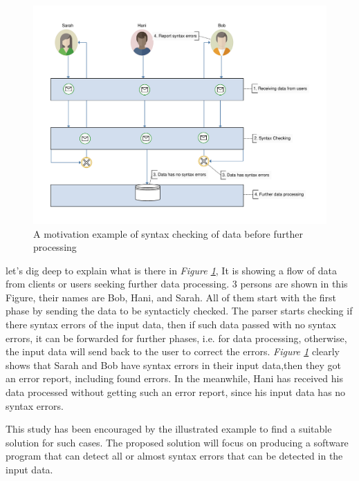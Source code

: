 	\begin{figure}[ht]
		\begin{center}
			\includegraphics[scale=0.5,angle=0]{images/motivation}
			\caption{A motivation example of syntax checking of data before further processing}
			\label{Fig:Motivation}
		\end{center}
	\end{figure}

	let's dig deep to explain what is there in  {\it Figure \ref{Fig:Motivation}}, It is showing a flow of data from clients or users seeking further data processing. 3 persons are shown in this Figure, their names are Bob, Hani, and Sarah. All of them start with the first phase by sending the data to be syntacticly checked. The parser starts checking if there syntax errors of the input data, then if such data passed with no syntax errors, it can be forwarded for further phases, i.e. for data processing, otherwise, the input data will send back to the user to correct the errors. {\it Figure \ref{Fig:Motivation}} clearly shows that Sarah and Bob have syntax errors in their input data,then they got an error report, including found errors. In the meanwhile, Hani has received his data processed without getting such an error report, since his input data has no syntax errors. 
			\par
			This study has been encouraged by the illustrated example to find a suitable solution for such cases. The proposed solution will focus on producing a software program that can detect all or almost syntax errors that can be detected in the input data. 

